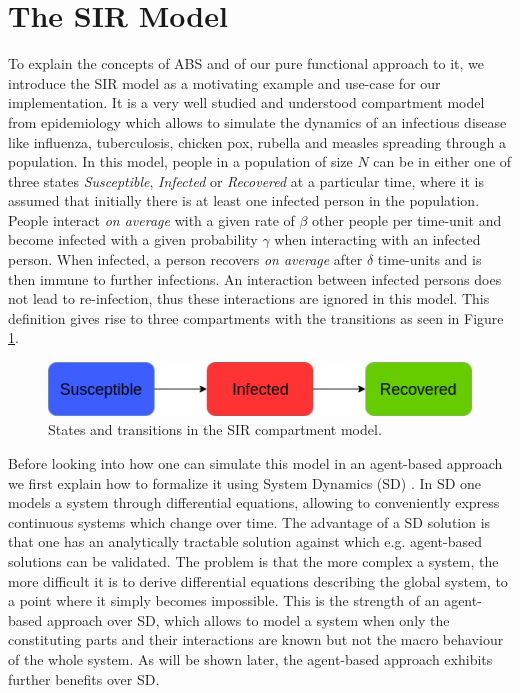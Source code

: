 \section{The SIR Model}
\label{sec:sir_model}
To explain the concepts of ABS and of our pure functional approach to it, we introduce the SIR model as a motivating example and use-case for our implementation. It is a very well studied and understood compartment model from epidemiology \cite{kermack_contribution_1927} which allows to simulate the dynamics of an infectious disease like influenza, tuberculosis, chicken pox, rubella and measles spreading through a population. In this model, people in a population of size $N$ can be in either one of three states \textit{Susceptible}, \textit{Infected} or \textit{Recovered} at a particular time, where it is assumed that initially there is at least one infected person in the population. People interact \textit{on average} with a given rate of $\beta$ other people per time-unit and become infected with a given probability $\gamma$ when interacting with an infected person. When infected, a person recovers \textit{on average} after $\delta$ time-units and is then immune to further infections. An interaction between infected persons does not lead to re-infection, thus these interactions are ignored in this model. This definition gives rise to three compartments with the transitions as seen in Figure \ref{fig:sir_transitions}.

\begin{figure}
	\centering
	\includegraphics[width=.4\textwidth, angle=0]{./fig/diagrams/SIR_transitions.png}
	\caption{States and transitions in the SIR compartment model.}
	\label{fig:sir_transitions}
\end{figure}

Before looking into how one can simulate this model in an agent-based approach we first explain how to formalize it using System Dynamics (SD) \cite{porter_industrial_1962}. In SD one models a system through differential equations, allowing to conveniently express continuous systems which change over time. The advantage of a SD solution is that one has an analytically tractable solution against which e.g. agent-based solutions can be validated. The problem is that the more complex a system, the more difficult it is to derive differential equations describing the global system, to a point where it simply becomes impossible. This is the strength of an agent-based approach over SD, which allows to model a system when only the constituting parts and their interactions are known but not the macro behaviour of the whole system. As will be shown later, the agent-based approach exhibits further benefits over SD.

